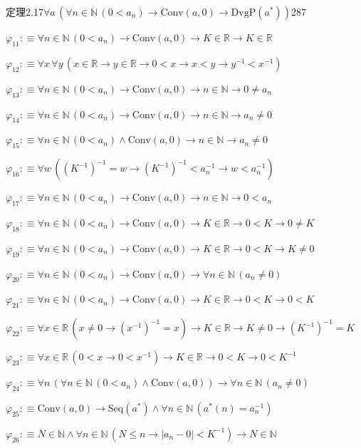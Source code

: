 \begin{fullproof}{定理2.17}{$\forall a\,(\forall n \in \mathbb{N}\,(0 < a_{n}) \to \mathrm{Conv}(a,0) \to \mathrm{DvgP}(a^{\ast}))$}{287}
\begin{abbrevlist}
\item $\varphi_{11} :\equiv \forall n \in \mathbb{N}\,(0 < a_{n}) \to \mathrm{Conv}(a,0) \to K \in \mathbb{R} \to K \in \mathbb{R}$
\item $\varphi_{12} :\equiv \forall x\,\forall y\,(x \in \mathbb{R} \to y \in \mathbb{R} \to 0 < x \to x < y \to y^{-1} < x^{-1})$
\item $\varphi_{13} :\equiv \forall n \in \mathbb{N}\,(0 < a_{n}) \to \mathrm{Conv}(a,0) \to n \in \mathbb{N} \to 0 \neq a_{n}$
\item $\varphi_{14} :\equiv \forall n \in \mathbb{N}\,(0 < a_{n}) \to \mathrm{Conv}(a,0) \to n \in \mathbb{N} \to a_{n} \neq 0$
\item $\varphi_{15} :\equiv \forall n \in \mathbb{N}\,(0 < a_{n}) \land \mathrm{Conv}(a,0) \to n \in \mathbb{N} \to a_{n} \neq 0$
\item $\varphi_{16} :\equiv \forall w\,((K^{-1})^{-1} = w \to (K^{-1})^{-1} < a_{n}^{-1} \to w < a_{n}^{-1})$
\item $\varphi_{17} :\equiv \forall n \in \mathbb{N}\,(0 < a_{n}) \to \mathrm{Conv}(a,0) \to n \in \mathbb{N} \to 0 < a_{n}$
\item $\varphi_{18} :\equiv \forall n \in \mathbb{N}\,(0 < a_{n}) \to \mathrm{Conv}(a,0) \to K \in \mathbb{R} \to 0 < K \to 0 \neq K$
\item $\varphi_{19} :\equiv \forall n \in \mathbb{N}\,(0 < a_{n}) \to \mathrm{Conv}(a,0) \to K \in \mathbb{R} \to 0 < K \to K \neq 0$
\item $\varphi_{20} :\equiv \forall n \in \mathbb{N}\,(0 < a_{n}) \to \mathrm{Conv}(a,0) \to \forall n \in \mathbb{N}\,(a_{n} \neq 0)$
\item $\varphi_{21} :\equiv \forall n \in \mathbb{N}\,(0 < a_{n}) \to \mathrm{Conv}(a,0) \to K \in \mathbb{R} \to 0 < K \to 0 < K$
\item $\varphi_{22} :\equiv \forall x \in \mathbb{R}\,(x \neq 0 \to (x^{-1})^{-1} = x) \to K \in \mathbb{R} \to K \neq 0 \to (K^{-1})^{-1} = K$
\item $\varphi_{23} :\equiv \forall x \in \mathbb{R}\,(0 < x \to 0 < x^{-1}) \to K \in \mathbb{R} \to 0 < K \to 0 < K^{-1}$
\item $\varphi_{24} :\equiv \forall n\,(\forall n \in \mathbb{N}\,(0 < a_{n}) \land \mathrm{Conv}(a,0)) \to \forall n \in \mathbb{N}\,(a_{n} \neq 0)$
\item $\varphi_{25} :\equiv \mathrm{Conv}(a,0) \to \mathrm{Seq}(a^{\ast}) \land \forall n \in \mathbb{N}\,(a^{\ast}(n) = a_{n}^{-1})$
\item $\varphi_{26} :\equiv N \in \mathbb{N} \land \forall n \in \mathbb{N}\,(N \leq n \to \lvert a_{n} - 0 \rvert < K^{-1}) \to N \in \mathbb{N}$

\end{abbrevlist}
\end{fullproof}

